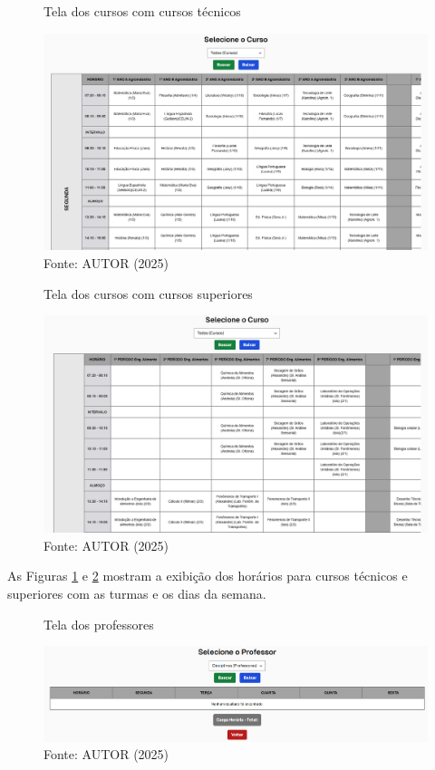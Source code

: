 \begin{figure}[htb]
    \centering
    \caption{Tela dos cursos com cursos técnicos}
    \includegraphics[width=1\textwidth]{Figuras/front-3.png}
    \caption*{Fonte: AUTOR (2025)}
    \label{fig_front_3}
\end{figure}

\begin{figure}[H]
    \centering
    \caption{Tela dos cursos com cursos superiores}
    \includegraphics[width=1\textwidth]{Figuras/front-4.png}
    \caption*{Fonte: AUTOR (2025)}
    \label{fig_front_4}
\end{figure}

As Figuras \ref{fig_front_3} e \ref{fig_front_4} mostram a exibição dos horários para cursos técnicos e superiores com as turmas e os dias da semana.

\begin{figure}[htb]
    \centering
    \caption{Tela dos professores}
    \includegraphics[width=1\textwidth]{Figuras/front-5.png}
    \caption*{Fonte: AUTOR (2025)}
    \label{fig_front_5}
\end{figure}

